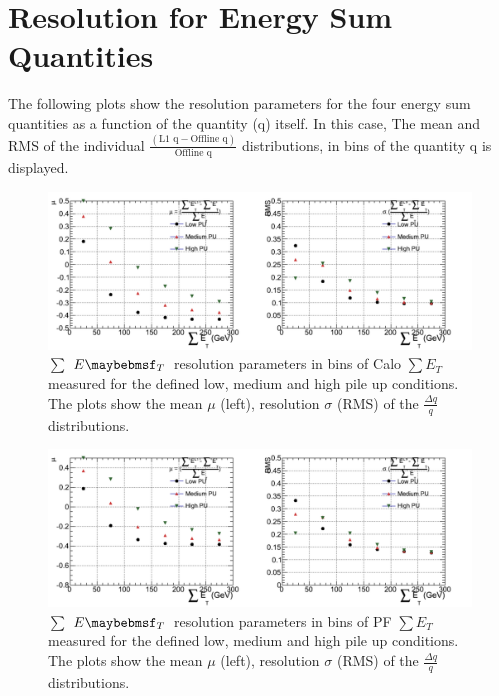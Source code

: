 \newpage
\section{Resolution for Energy Sum Quantities}
\label{app:jetenergysums}

The following plots show the resolution parameters for the four energy sum quantities as a function of the quantity (q) itself. In this case, The mean and RMS of the individual $\frac{(\text{L1 q} -  \text{Offline q})}{\text{Offline q}}$ distributions, in bins of the quantity q is displayed. 

\begin{figure}[h!]
  \vspace{20pt}
        \centering
        \includegraphics[width=1.0\textwidth]{plots/res_CaloSumET_summary.pdf}
        \caption[$\sum$ $\et$~resolution parameters in bins of Calo $\sum E_{T}$  measured for the defined low, medium and high pile up conditions.]{$\sum$ $\et$~resolution parameters in bins of Calo $\sum E_{T}$  measured for the defined low, medium and high pile up conditions. The plots show the mean $\mu$ (left), resolution $\sigma$ (RMS) of the $\frac{\Delta q}{q}$ distributions.}
        \label{fig:caloetresultspu}
\end{figure}
\begin{figure}[h!]
  \vspace{20pt}
  \centering
        \includegraphics[width=1.0\textwidth]{plots/res_pfSumET_summary.pdf}
        \caption[$\sum$ $\et$~resolution parameters in bins of PF $\sum E_{T}$  measured for the defined low, medium and high pile up conditions. ]{$\sum$ $\et$~resolution parameters in bins of PF $\sum E_{T}$  measured for the defined low, medium and high pile up conditions. The plots show the mean $\mu$ (left), resolution $\sigma$ (RMS) of the $\frac{\Delta q}{q}$ distributions.}
        \label{fig:pfetresultspu}
\end{figure}

